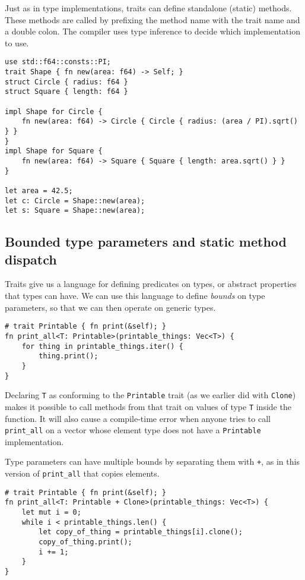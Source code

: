 \documentclass[]{article}
\begin{document}
Just as in type implementations, traits can define standalone (static)
methods. These methods are called by prefixing the method name with the
trait name and a double colon. The compiler uses type inference to
decide which implementation to use.

\begin{verbatim}
use std::f64::consts::PI;
trait Shape { fn new(area: f64) -> Self; }
struct Circle { radius: f64 }
struct Square { length: f64 }

impl Shape for Circle {
    fn new(area: f64) -> Circle { Circle { radius: (area / PI).sqrt() } }
}
impl Shape for Square {
    fn new(area: f64) -> Square { Square { length: area.sqrt() } }
}

let area = 42.5;
let c: Circle = Shape::new(area);
let s: Square = Shape::new(area);
\end{verbatim}

\subsection{Bounded type parameters and static method
dispatch}\label{bounded-type-parameters-and-static-method-dispatch}

Traits give us a language for defining predicates on types, or abstract
properties that types can have. We can use this language to define
\emph{bounds} on type parameters, so that we can then operate on generic
types.

\begin{verbatim}
# trait Printable { fn print(&self); }
fn print_all<T: Printable>(printable_things: Vec<T>) {
    for thing in printable_things.iter() {
        thing.print();
    }
}
\end{verbatim}

Declaring \texttt{T} as conforming to the \texttt{Printable} trait (as
we earlier did with \texttt{Clone}) makes it possible to call methods
from that trait on values of type \texttt{T} inside the function. It
will also cause a compile-time error when anyone tries to call
\texttt{print\_all} on a vector whose element type does not have a
\texttt{Printable} implementation.

Type parameters can have multiple bounds by separating them with
\texttt{+}, as in this version of \texttt{print\_all} that copies
elements.

\begin{verbatim}
# trait Printable { fn print(&self); }
fn print_all<T: Printable + Clone>(printable_things: Vec<T>) {
    let mut i = 0;
    while i < printable_things.len() {
        let copy_of_thing = printable_things[i].clone();
        copy_of_thing.print();
        i += 1;
    }
}
\end{verbatim}
\end{document}
